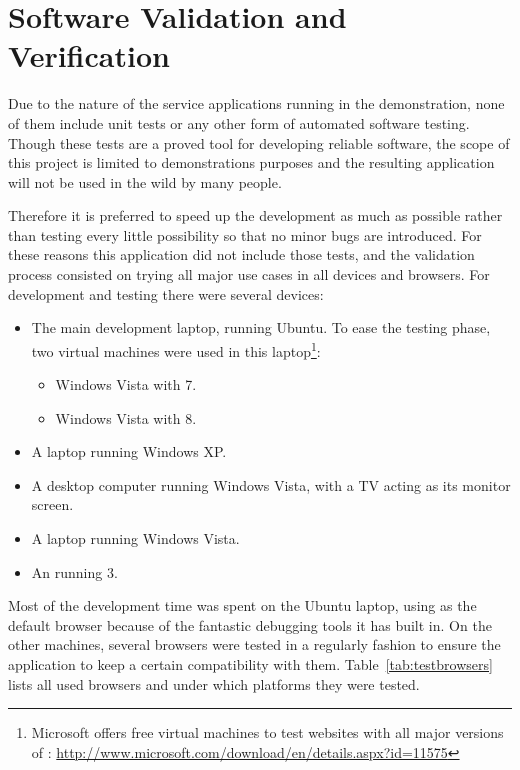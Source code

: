 \section{Software Validation and Verification} %
\label{sec:software_validation_and_verification}

Due to the nature of the service applications running in the demonstration, none of them include unit tests or any other form of automated software testing.
Though these tests are a proved tool for developing reliable software, the scope of this project is limited to demonstrations purposes and the resulting application will not be used in the wild by many people.

Therefore it is preferred to speed up the development as much as possible rather than testing every little possibility so that no minor bugs are introduced.
For these reasons this application did not include those tests, and the validation process consisted on trying all major use cases in all devices and browsers.
For development and testing there were several devices:

\begin{itemize}
  \item The main development laptop, running Ubuntu. To ease the testing phase, two virtual machines were used in this laptop\footnote{Microsoft offers free virtual machines to test websites with all major versions of : \url{http://www.microsoft.com/download/en/details.aspx?id=11575}}:
  \begin{itemize}
    \item Windows Vista with  7.
    \item Windows Vista with  8.
  \end{itemize}
  \item A laptop running Windows XP.
  \item A desktop computer running Windows Vista, with a TV acting as its monitor screen.
  \item A laptop running Windows Vista.
  \item An  running  3.
\end{itemize}

Most of the development time was spent on the Ubuntu laptop, using  as the default browser because of the fantastic debugging tools it has built in.
On the other machines, several browsers were tested in a regularly fashion to ensure the application to keep a certain compatibility with them.
Table~\vref{tab:testbrowsers} lists all used browsers and under which platforms they were tested.

